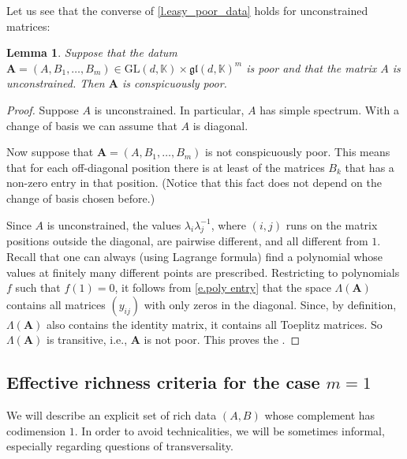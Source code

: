 \documentclass[10pt, a4paper]{amsart}
\theoremstyle{plain}
\newtheorem{lemma}{Lemma}[section]
\theoremstyle{definition}
\theoremstyle{remark}
\theoremstyle{note}
\numberwithin{equation}{section}
\begin{document}
Let us see that the converse of \cref{l.easy_poor_data} holds for unconstrained matrices:

\begin{lemma}\label{l.easy_fiber}
Suppose that the datum 
${\mathbf{A}} = (A, B_1, \dots, B_m) \in {\mathrm{GL}}(d,{\mathbb{K}}) \times {\mathfrak{gl}}(d,{\mathbb{K}})^m$ is poor
and that the matrix $A$ is unconstrained.
Then ${\mathbf{A}}$ is conspicuously poor.
\end{lemma}

\begin{proof}
Suppose $A$ is unconstrained.
In particular, $A$ has simple spectrum.
With a change of basis we can assume that $A$ is diagonal.

Now suppose that ${\mathbf{A}} = (A, B_1, \dots, B_m)$ is not conspicuously poor.
This means that for each off-diagonal position there is at least of the matrices $B_k$
that has a non-zero entry in that position.
(Notice that this fact does not depend on the change of basis chosen before.)

Since $A$ is unconstrained, the values $\lambda_i \lambda_j^{-1}$, 
where $(i,j)$ runs on the matrix positions outside the diagonal, are pairwise different, 
and all different from $1$. 
Recall that one can always (using Lagrange formula) find a polynomial 
whose values at finitely many different points are prescribed.
Restricting to polynomials $f$ such that $f(1)=0$,
it follows from \eqref{e.poly entry}
that the space $\Lambda({\mathbf{A}})$ contains all matrices $(y_{ij})$ 
with only zeros in the diagonal.
Since, by definition, $\Lambda({\mathbf{A}})$ also contains the identity matrix,
it contains all Toeplitz matrices.
So $\Lambda({\mathbf{A}})$ is transitive, i.e., ${\mathbf{A}}$ is not poor.
This proves the .
\end{proof}

\subsection{Effective richness criteria for the case $m=1$}
We will describe an explicit set of rich data $(A,B)$ whose complement has codimension $1$.
In order to avoid technicalities, we will be sometimes informal, especially regarding questions of transversality.

\medskip
\end{document}
